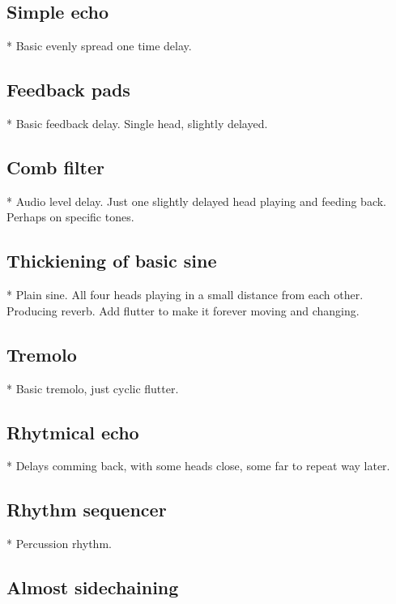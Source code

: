 \documentclass[11pt]{article}
\begin{document}
\newpage


\subsection{Simple echo}

* Basic evenly spread one time delay.

\subsection{Feedback pads}

* Basic feedback delay. Single head, slightly delayed.

\subsection{Comb filter}

* Audio level delay. Just one slightly delayed head playing and feeding back.
  Perhaps on specific tones.

\subsection{Thickiening of basic sine}

* Plain sine. All four heads playing in a small distance from each other.
  Producing reverb. Add flutter to make it forever moving and changing.

\subsection{Tremolo}

* Basic tremolo, just cyclic flutter.

\subsection{Rhytmical echo}

* Delays comming back, with some heads close, some far to repeat way later.

\subsection{Rhythm sequencer}

* Percussion rhythm.

\subsection{Almost sidechaining}
\end{document}
